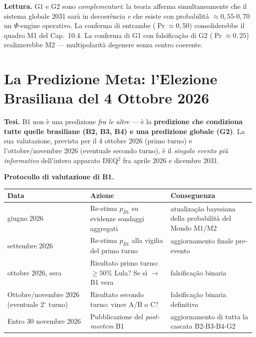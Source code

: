 \Hypoth{} \textbf{Lettura.} G1 e G2 sono \emph{complementari}: la teoria
afferma simultaneamente che il sistema globale 2031 sarà in decoerência
\emph{e} che esiste con probabilità \(\approx 0{,}55\)-\(0{,}70\) un
\(\Phi\)-engine operativo. La conferma di entrambe
(\(\Pr \approx 0{,}50\)) consoliderebbe il quadro M1 del Cap.~10.4. La
conferma di G1 con falsificação di G2 (\(\Pr \approx 0{,}25\))
realizzerebbe M2 --- multipolarità degenere senza centro coerente.



\section{La Predizione Meta: l'Elezione Brasiliana del 4 Ottobre
2026}\label{la-predizione-meta-lelezione-brasileira-del-4-ottobre-2026}

\Hypoth{} \textbf{Tesi.} B1 non è una predizione \emph{fra le altre} ---
è la \textbf{predizione che condiziona tutte quelle brasiliane (B2, B3,
B4) e una predizione globale (G2)}. La sua valutazione, prevista per il
4 ottobre 2026 (primo turno) e l'ottobre/novembre 2026 (eventuale
secondo turno), è il \emph{singolo evento più informativo} dell'intero
apparato DEQ$^2$ fra aprile 2026 e dicembre 2031.

\Proved{} \textbf{Protocollo di valutazione di B1.}

{\def\LTcaptype{none} %
{\small\begin{longtable}[]{@{}
  >{\raggedright\arraybackslash}p{}
  >{\raggedright\arraybackslash}p{}
  >{\raggedright\arraybackslash}p{}@{}}
\toprule\noalign{}
\begin{minipage}[b]{\linewidth}\raggedright
Data
\end{minipage} & \begin{minipage}[b]{\linewidth}\raggedright
Azione
\end{minipage} & \begin{minipage}[b]{\linewidth}\raggedright
Conseguenza
\end{minipage} \\
\midrule\noalign{}
\endhead
\bottomrule\noalign{}
\endlastfoot
30 giugno 2026 & Re-stima \(p_{B1}\) su evidenze sondaggi aggregati &
atualização bayesiana della probabilità del Mondo M1/M2 \\
30 settembre 2026 & Re-stima \(p_{B1}\) alla vigilia del primo turno &
aggiornamento finale pre-evento \\
4 ottobre 2026, sera & Risultato primo turno: \(\geq 50\%\) Lula? Se sì
$\to$ B1 vera & falsificação binaria \\
Ottobre/novembre 2026 (eventuale 2$^\circ$ turno) & Risultato secondo turno:
vince A/B o C? & falsificação binaria definitiva \\
Entro 30 novembre 2026 & Pubblicazione del \emph{post-mortem} B1 &
aggiornamento di tutta la cascata B2-B3-B4-G2 \\
\end{longtable}}
}

